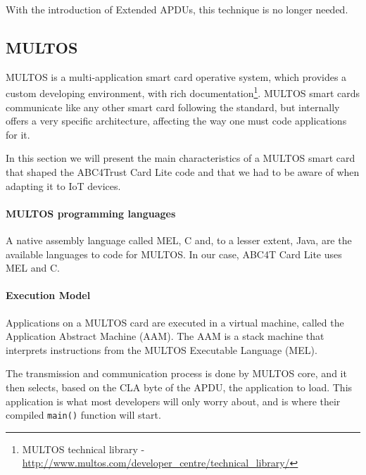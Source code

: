 With the introduction of Extended APDUs, this technique is no longer needed.






\subsection{MULTOS}

MULTOS is a multi-application smart card operative system, which provides a custom developing environment, with rich documentation\footnote{MULTOS technical library - \url{http://www.multos.com/developer_centre/technical_library/}}. MULTOS smart cards communicate like any other smart card following the standard, but internally offers a very specific architecture, affecting the way one must code applications for it.

In this section we will present the main characteristics of a MULTOS smart card that shaped the ABC4Trust Card Lite code and that we had to be aware of when adapting it to IoT devices.


\paragraph{MULTOS programming languages} A native assembly language called MEL, C and, to a lesser extent, Java, are the available languages to code for MULTOS. In our case, ABC4T Card Lite uses MEL and C.

\paragraph{Execution Model}
Applications on a MULTOS card are executed in a virtual machine, called the Application Abstract Machine (AAM). The AAM is a stack machine that interprets instructions from the MULTOS Executable
Language (MEL).

The transmission and communication process is done by MULTOS core, and it then selects, based on the CLA byte of the APDU, the application to load. This application is what most developers will only worry about, and is where their compiled \texttt{main()} function will start.

